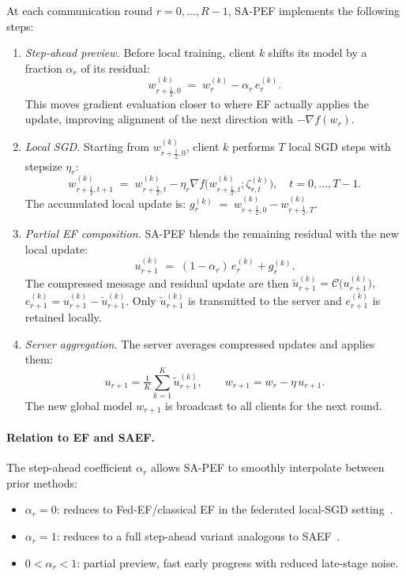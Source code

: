 \documentclass{article} %
\begin{document}
At each communication round $r=0,\dots,R-1$, SA-PEF implements the following steps: 
\begin{enumerate}[leftmargin=*,itemsep=0pt,topsep=2pt,parsep=0pt]
  \item \emph{Step-ahead preview.} 
  Before local training, client $k$ shifts its model by a fraction $\alpha_r$ of its residual:
  \[
  w^{(k)}_{r+\tfrac12,0} \;=\; w^{(k)}_{r} - \alpha_r\, e^{(k)}_{r}.
  \]
  This moves gradient evaluation closer to where EF actually applies the update, improving
  alignment of the next direction with $-\nabla f(w_r)$.
  
  \item \emph{Local SGD.} 
  Starting from $w^{(k)}_{r+\tfrac12,0}$, client $k$ performs $T$ local SGD steps with stepsize $\eta_r$:
  \[
  w^{(k)}_{r+\tfrac12,t+1} \;=\; w^{(k)}_{r+\tfrac12,t}
  -\eta_r \nabla f\!\bigl(w^{(k)}_{r+\tfrac12,t};\zeta^{(k)}_{r,t}\bigr), 
  \quad t=0,\ldots,T-1.
  \]
  The accumulated local update is: $g_r^{(k)} \;=\; w^{(k)}_{r+\tfrac12,0} - w^{(k)}_{r+\tfrac12,T}.$
  
  \item \emph{Partial EF composition.} 
  SA-PEF blends the remaining residual with the new local update:
  \[
  u_{r+1}^{(k)} \;=\; (1-\alpha_r)\, e_r^{(k)} + g_r^{(k)}.
  \]
  The compressed message and residual update are then $\tilde u_{r+1}^{(k)} = \mathcal{C}\!\bigl(u_{r+1}^{(k)}\bigr), $
  $e_{r+1}^{(k)} = u_{r+1}^{(k)} - \tilde u_{r+1}^{(k)}.$
  Only $\tilde u_{r+1}^{(k)}$ is transmitted to the server and $e_{r+1}^{(k)}$ is retained locally.
  
  \item \emph{Server aggregation.} 
  The server averages compressed updates and applies them:
  \[
  u_{r+1} = \tfrac{1}{K}\sum_{k=1}^K \tilde u_{r+1}^{(k)}, 
  \qquad
  w_{r+1} = w_r - \eta \, u_{r+1}.
  \]
  The new global model $w_{r+1}$ is broadcast to all clients for the next round.
\end{enumerate}

\paragraph{Relation to EF and SAEF.} 
The step-ahead coefficient $\alpha_r$ allows SA-PEF to smoothly interpolate between prior methods:
\begin{itemize}[leftmargin=*,itemsep=0pt,topsep=0pt,parsep=0pt]
  \item $\alpha_r=0$: reduces to Fed-EF/classical EF in the federated local-SGD setting~\citep{li2023analysis}. 
  \item $\alpha_r=1$: reduces to a full step-ahead variant analogous to SAEF~\citep{xu2021step}. 
  \item $0<\alpha_r<1$: partial preview, fast early progress with reduced late-stage noise. 
\end{itemize}
\end{document}
